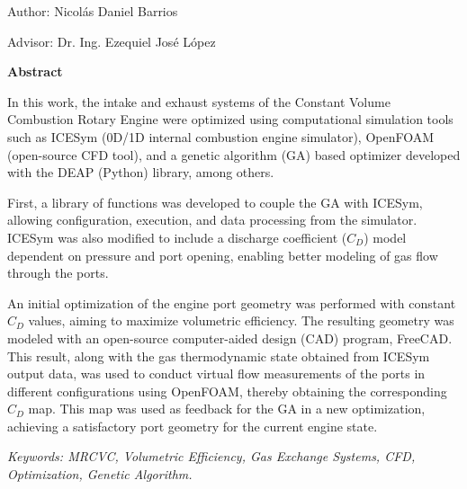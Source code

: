 \normalsize \hfill Author: Nicolás Daniel Barrios

\hfill Advisor: Dr. Ing. Ezequiel José López

\textbf{Abstract}

In this work, the intake and exhaust systems of the Constant Volume Combustion
Rotary Engine were optimized using computational simulation tools such
as ICESym (0D/1D internal combustion engine simulator), OpenFOAM (open-source
CFD tool), and a genetic algorithm (GA) based optimizer developed with the DEAP
(Python) library, among others.

First, a library of functions was developed to couple the GA with ICESym,
allowing configuration, execution, and data processing from the simulator.
%
ICESym was also modified to include a discharge coefficient ($C_{D}$) model
dependent on pressure and port opening, enabling better modeling of gas flow
through the ports.

An initial optimization of the engine port geometry was performed with constant
$C_{D}$ values, aiming to maximize volumetric efficiency.
%
The resulting geometry was modeled with an open-source computer-aided design
(CAD) program, FreeCAD.
%
This result, along with the gas thermodynamic state obtained from ICESym output
data, was used to conduct virtual flow measurements of the ports in different
configurations using OpenFOAM, thereby obtaining the corresponding $C_{D}$ map.
%
This map was used as feedback for the GA in a new optimization, achieving a
satisfactory port geometry for the current engine state.

\noindent

\textit{Keywords: MRCVC, Volumetric Efficiency, Gas Exchange Systems, CFD,
Optimization, Genetic Algorithm.}


\newpage
